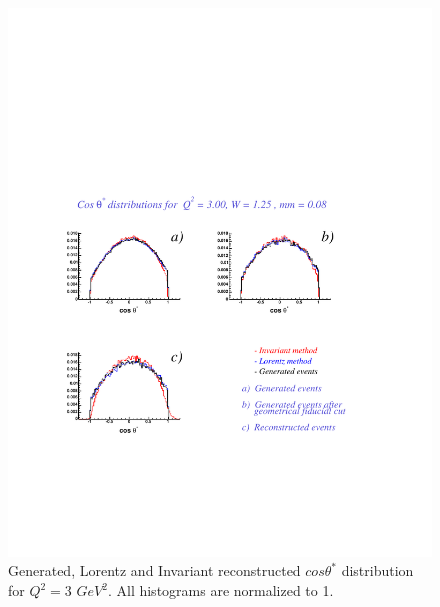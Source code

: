 \begin{figure}[h]
 \begin{center}
  \includegraphics[width = 12cm, bb = 60 140 540 540]{appendix/img/ctheta_q23.00_W1.25_mm0.08}
  \caption{Generated, Lorentz and Invariant reconstructed $cos\theta^*$ distribution for $Q^2=3$ $GeV^2$.
           All histograms are normalized to 1.}
 \end{center}
\end{figure} 
